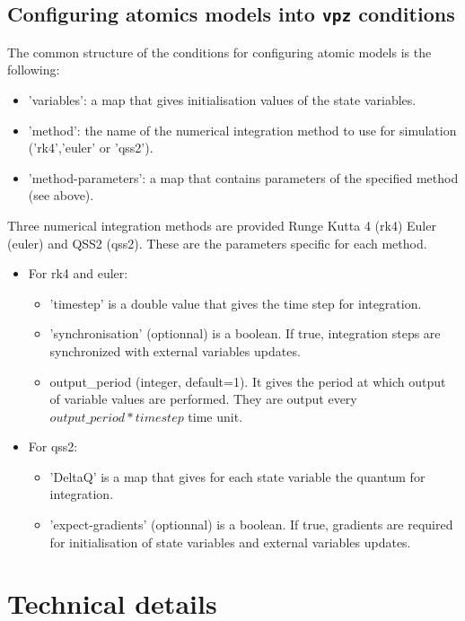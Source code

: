 \documentclass{article}
\theoremstyle{remark}
\begin{document}
\subsection{Configuring atomics models into {\tt vpz} conditions}
\label{sec:user:conf}

The common structure of the conditions for configuring atomic models is the
following:
\begin{itemize}
  \item 'variables': a map that gives initialisation values of the
  state variables.
  \item 'method': the name of the numerical integration method to use for
  simulation ('rk4','euler' or 'qss2').
  \item 'method-parameters': a map that contains parameters of the specified
  method (see above).
\end{itemize} 

Three numerical integration methods are provided Runge Kutta 4 (rk4) Euler
(euler) and QSS2 (qss2). These are the parameters specific for each method.
\begin{itemize}
  \item For rk4 and euler:
  \begin{itemize}
    \item  'timestep' is a double value that gives the time step for
    integration.
    \item 'synchronisation' (optionnal) is a boolean. If true, integration steps
    are synchronized with external variables updates.
    \item output\_period (integer, default=1). It gives the period at which
    output of variable values are performed. They are output every
    ${output\_period} * {timestep}$ time unit.
  \end{itemize}
  \item For qss2: 
  \begin{itemize}
    \item 'DeltaQ' is a map that gives for each state variable the 
  quantum for integration.
	\item 'expect-gradients' (optionnal) is a boolean. If true, gradients are
	required for initialisation of state variables and external variables updates. 
  \end{itemize}
\end{itemize}

\section{Technical details}
\end{document}
